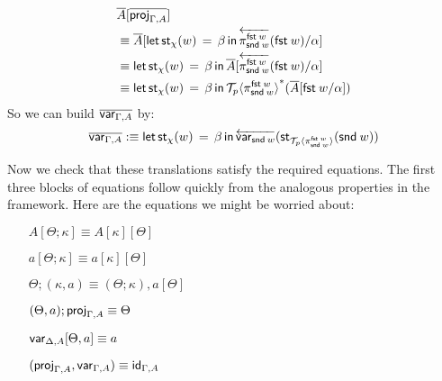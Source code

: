 \documentclass[10pt]{article}
\theoremstyle{definition}
\newcommand\dsd[1]{\ensuremath{\mathsf{#1}}}
\newcommand{\app}[2]{\ensuremath{#1 \: #2}}
\newcommand{\fst}[1]{\app{\dsd{fst}}{#1}}
\newcommand{\snd}[1]{\app{\dsd{snd}}{#1}}
\newcommand{\id}{\mathsf{id}}
\newcommand{\rewrite}[2]{\overleftarrow{#1}(#2)}
\newcommand\St[2]{\ensuremath{{#1}^*(#2)}}
\newcommand\StI[2]{\ensuremath{\mathsf{st}_{#1}(#2)}}
\newcommand\StE[4]{\ensuremath{\mathsf{let} \, \StI{#1}{#3} \, = \, {#2} \, \mathsf{in} \, #4}}
\newcommand\ApEl[2]{\mathcal{T}_{#1}\langle#2\rangle}
\begin{document}
\begin{itemize}
\begin{enumerate}
\begin{align*}
&\upstairs{A}[\upstairs{\proj{\Gamma, A}}] \\
&\equiv \upstairs{A}[\StE{\chi}{\beta}{w}{\rewrite{\pi^{\fst w}_{\snd w}}{\fst w}}/\alpha] \\
&\equiv \StE{\chi}{\beta}{w}{\upstairs{A}[\rewrite{\pi^{\fst w}_{\snd w}}{\fst w}/\alpha]} \\
&\equiv \StE{\chi}{\beta}{w}{\St{\ApEl{p}{\pi^{\fst w}_{\snd w}}}{\upstairs{A}[\fst w/\alpha]}} 
\end{align*}
So we can build $\overline{\mathsf{var}_{\Gamma, A}}$ by:
\begin{align*}
\upstairs{\var{\Gamma, A}} :\equiv \StE{\chi}{\beta}{w}{\rewrite{\var{\snd w}}{\StI{\ApEl{p}{\pi^{\fst w}_{\snd w}}}{\snd w}}}
\end{align*}
\end{enumerate}

Now we check that these translations satisfy the required equations. The first three blocks of equations follow quickly from the analogous properties in the framework. Here are the equations we might be worried about:
\begin{enumerate}[style = multiline, labelwidth = 80pt]
\item[{$A[\Theta ; \kappa] \equiv A[\kappa][\Theta]$}] 
\item[{$a[\Theta ; \kappa] \equiv a[\kappa][\Theta]$}] 
\item[{$\Theta ; (\kappa , a) \equiv (\Theta ; \kappa) , a[\Theta]$}] 
\item[{$(\Theta, a);\mathsf{proj}_{\Gamma,A} \equiv \Theta$}]
\item[{$\mathsf{var}_{\Delta,A}[\Theta, a] \equiv a$}] 
\item[{$(\proj{\Gamma,A}, \var{\Gamma,A}) \equiv \id_{\Gamma, A}$}]
\end{enumerate}
\end{itemize}
\end{document}
